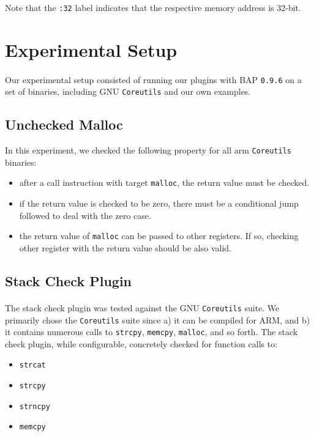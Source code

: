 \documentclass[letterpaper,11pt]{article}
\begin{document}
Note that the \texttt{:32} label indicates that the respective memory address is
32-bit.


\section{Experimental Setup}

\paragraph{}
Our experimental setup consisted of running our plugins with BAP \texttt{0.9.6}
\cite{bap} on a set of binaries, including GNU \texttt{Coreutils} and our
own examples.

\subsection{Unchecked Malloc}

In this experiment, we checked the following property for all arm
\texttt{Coreutils} binaries:
\begin{itemize}
\item after a call instruction with target \texttt{malloc}, the return value
    must be checked.
\item if the return value is checked to be zero, there must be a conditional
    jump followed to deal with the zero case.
\item the return value of \texttt{malloc} can be passed to other registers. If
    so, checking other register with the return value should be also valid.
\end{itemize}

\subsection{Stack Check Plugin}

\paragraph{}
The stack check plugin was tested against the GNU \texttt{Coreutils} suite. We
primarily chose the \texttt{Coreutils} suite since a) it can be compiled for
ARM, and b) it contains numerous calls to \texttt{strcpy}, \texttt{memcpy},
\texttt{malloc}, and so forth. The stack check plugin, while configurable,
concretely checked for function calls to:

\begin{itemize}
  \item \texttt{strcat}
  \item \texttt{strcpy}
  \item \texttt{strncpy}
  \item \texttt{memcpy}
\end{itemize}
\end{document}
